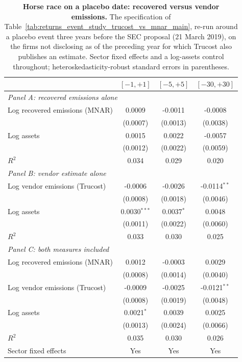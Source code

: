 \documentclass[a4paper,12pt]{article}
\begin{document}
\begin{table}[htbp]
\footnotesize\centering
\caption{\textbf{Horse race on a placebo date: recovered versus vendor emissions.}
The specification of Table~\ref{tab:returns_event_study_trucost_vs_mnar_main}, re-run
around a placebo event three years before the SEC proposal (21 March 2019), on the
firms not disclosing as of the preceding year for which Trucost also publishes an
estimate. Sector fixed effects and a log-assets control throughout;
heteroskedasticity-robust standard errors in parentheses.}
\label{tab:returns_event_study_trucost_vs_mnar_plac}
\begin{tabular}{lccc}
\toprule
 & $[-1,+1]$ & $[-5,+5]$ & $[-30,+30]$ \\
\midrule
\multicolumn{4}{l}{\emph{Panel A: recovered emissions alone}} \\[2pt]
Log recovered emissions (MNAR) & 0.0009 & -0.0011 & -0.0008 \\
 & (0.0007) & (0.0013) & (0.0038) \\
Log assets & 0.0015 & 0.0022 & -0.0057 \\
 & (0.0012) & (0.0022) & (0.0059) \\
$R^2$ & 0.034 & 0.029 & 0.020 \\
\midrule
\multicolumn{4}{l}{\emph{Panel B: vendor estimate alone}} \\[2pt]
Log vendor emissions (Trucost) & -0.0006 & -0.0026 & -0.0114$^{**}$ \\
 & (0.0008) & (0.0018) & (0.0046) \\
Log assets & 0.0030$^{***}$ & 0.0037$^{*}$ & 0.0048 \\
 & (0.0011) & (0.0022) & (0.0060) \\
$R^2$ & 0.033 & 0.030 & 0.025 \\
\midrule
\multicolumn{4}{l}{\emph{Panel C: both measures included}} \\[2pt]
Log recovered emissions (MNAR) & 0.0012 & -0.0003 & 0.0029 \\
 & (0.0008) & (0.0014) & (0.0040) \\
Log vendor emissions (Trucost) & -0.0009 & -0.0025 & -0.0121$^{**}$ \\
 & (0.0008) & (0.0019) & (0.0048) \\
Log assets & 0.0021$^{*}$ & 0.0039 & 0.0025 \\
 & (0.0013) & (0.0024) & (0.0066) \\
$R^2$ & 0.035 & 0.030 & 0.026 \\
\midrule
Sector fixed effects & Yes & Yes & Yes \\

\end{tabular}
\end{table}
\end{document}
